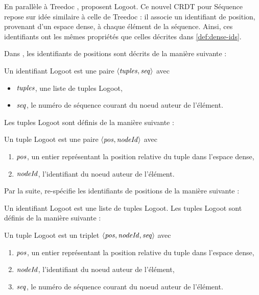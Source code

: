 En parallèle à Treedoc \cite{2009-treedoc-preguica}, \textcite{2009-logoot-weiss} proposent Logoot.
Ce nouvel \ac{CRDT} pour Séquence repose sur idée similaire à celle de Treedoc : il associe un identifiant de position, provenant d'un espace dense, à chaque élément de la séquence.
Ainsi, ces identifiants ont les mêmes propriétés que celles décrites dans \autoref{def:dense-ids}.

Dans \cite{2009-logoot-weiss}, les identifiants de positions sont décrits de la manière suivante :
\begin{definition}
  Un identifiant Logoot est une paire $\langle \mathit{tuples},\mathit{seq} \rangle$ avec
  \begin{itemize}
    \item $\mathit{tuples}$, une liste de tuples Logoot,
    \item $\mathit{seq}$, le numéro de séquence courant du noeud auteur de l'élément.
  \end{itemize}
  Les tuples Logoot sont définis de la manière suivante :
  \begin{subdefinition}
    Un tuple Logoot est une paire $\langle \mathit{pos},\mathit{nodeId} \rangle$ avec
    \begin{enumerate}
      \item $\mathit{pos}$, un entier représentant la position relative du tuple dans l'espace dense,
      \item $\mathit{nodeId}$, l'identifiant du noeud auteur de l'élément.
    \end{enumerate}
  \end{subdefinition}
\end{definition}

Par la suite, \cite{2010-logoot-undo-weiss} re-spécifie les identifiants de positions de la manière suivante :
\begin{definition}
  Un identifiant Logoot est une liste de tuples Logoot.
  Les tuples Logoot sont définis de la manière suivante :
  \begin{subdefinition}
    Un tuple Logoot est un triplet $\langle \mathit{pos},\mathit{nodeId},\mathit{seq} \rangle$ avec
    \begin{enumerate}
      \item $\mathit{pos}$, un entier représentant la position relative du tuple dans l'espace dense,
      \item $\mathit{nodeId}$, l'identifiant du noeud auteur de l'élément,
      \item $\mathit{seq}$, le numéro de séquence courant du noeud auteur de l'élément.
    \end{enumerate}
  \end{subdefinition}
\end{definition}

